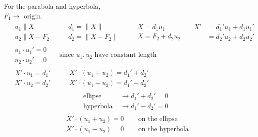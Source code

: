 \documentclass[twoside]{amsart}
\theoremstyle{plain}
\theoremstyle{definition}
\begin{document}
For the parabola and hyperbola, \\
$F_1 \to $ origin.  
\[
\begin{gathered}
  \begin{aligned}
    & u_1 \parallel X   \\
    & u_2 \parallel X-F_2
  \end{aligned} \quad \, 
  \begin{aligned}
    & d_1 = \| X \| \\
    & d_2 = \| X - F_2 \| 
  \end{aligned} \quad \, 
  \begin{aligned}
    & X = d_1 u_1 \\
    & X = F_2 + d_2 u_2 
  \end{aligned} \quad \, 
  \begin{aligned}
    X' & = d_1' u_1 + d_1 u_1' \\
    & = d_2' u_2 + d_2 u_2' 
  \end{aligned} \\
  \begin{aligned}
    & u_1 \cdot u_1' = 0 \\
    & u_2 \cdot u_2' = 0 
  \end{aligned} \quad \, \text{ since $u_1, u_2$ have constant length } \\
  \begin{aligned}
    & X'\cdot u_1 = d_1' \\
    & X' \cdot u_2 = d_2'
  \end{aligned} \quad \, 
  \begin{aligned}
    & X' \cdot (u_1 + u_2 ) = d_1' + d_2' \\
    & X' \cdot (u_1 - u_2 ) = d_1' - d_2'
  \end{aligned} 
\end{gathered}
\]
\[
\begin{gathered}
  \begin{aligned}
  & \text{ ellipse } & \to d_1' + d_2' = 0  \\
  & \text{ hyperbola } & \to d_1' - d_2' =0 
  \end{aligned} \quad \,
\end{gathered}
\]
\[
\begin{gathered}
\begin{aligned}
  & X' \cdot (u_1 + u_2) = 0 \quad & \text{ on the ellipse } \\ 
  & X'\cdot (u_1 - u_2) = 0 \quad &  \text{ on the hyperbola } 
\end{aligned} \\
\quad  \\
\end{gathered}
\]
\end{document}

